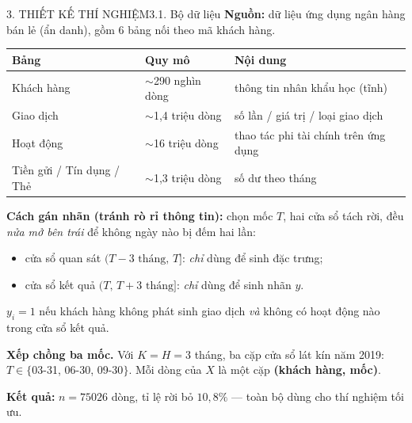 \documentclass[aspectratio=169,11pt]{beamer}
\begin{document}
\begin{frame}{3. THIẾT KẾ THÍ NGHIỆM}{3.1. Bộ dữ liệu}
  \label{sec:3}%
  \footnotesize
  \textbf{Nguồn:} dữ liệu ứng dụng ngân hàng bán lẻ (ẩn danh), gồm 6 bảng nối theo mã khách hàng.
  \begin{center}\footnotesize
  \begin{tabular}{lll}
    \toprule
    Bảng & Quy mô & Nội dung\\
    \midrule
    Khách hàng      & $\sim$290 nghìn dòng & thông tin nhân khẩu học (tĩnh)\\
    Giao dịch       & $\sim$1{,}4 triệu dòng & số lần / giá trị / loại giao dịch\\
    Hoạt động       & $\sim$16 triệu dòng & thao tác phi tài chính trên ứng dụng\\
    Tiền gửi / Tín dụng / Thẻ & $\sim$1{,}3 triệu dòng & số dư theo tháng\\
    \bottomrule
  \end{tabular}
  \end{center}
  \vspace{6pt}
  \textbf{Cách gán nhãn (tránh rò rỉ thông tin):} chọn mốc $T$, hai cửa sổ tách rời, đều
  \emph{nửa mở bên trái} để không ngày nào bị đếm hai lần:
  \begin{itemize}
    \item cửa sổ quan sát $(T-3\text{ tháng},\,T]$: \emph{chỉ} dùng để sinh đặc trưng;
    \item cửa sổ kết quả $(T,\,T+3\text{ tháng}]$: \emph{chỉ} dùng để sinh nhãn $y$.
  \end{itemize}
  $y_i=1$ nếu khách hàng không phát sinh giao dịch \emph{và} không có hoạt động nào trong cửa sổ kết quả.
  \vspace{2pt}

  \textbf{Xếp chồng ba mốc.} Với $K=H=3$ tháng, ba cặp cửa sổ lát kín năm 2019:
  $T\in\{$03-31, 06-30, 09-30$\}$. Mỗi dòng của $X$ là một cặp \textbf{(khách hàng, mốc)}.
  \vspace{2pt}

  \textbf{Kết quả:} $n=\num{75026}$ dòng, tỉ lệ rời bỏ $10{,}8\%$ — toàn bộ dùng cho thí nghiệm tối ưu.
\end{frame}
\end{document}
